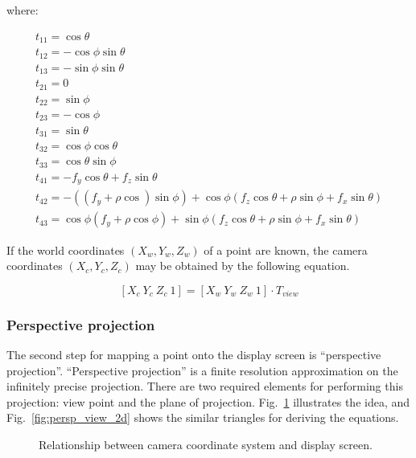 where: 

\[ \begin{array}{l}

	t_{11} = \cos\theta \\
	t_{12} = -\cos\phi\sin\theta \\
	t_{13} = -\sin\phi\sin\theta \\

  	t_{21} = 0 \\
  	t_{22} = \sin\phi \\
  	t_{23} = -\cos\phi \\

  	t_{31} = \sin\theta \\
  	t_{32} = \cos\phi\cos\theta \\
  	t_{33} = \cos\theta\sin\phi \\

  	t_{41} = -f_y\cos\theta + f_z\sin\theta \\
  	t_{42} = -((f_y + \rho\cos)\sin\phi) + \cos\phi(f_z \cos\theta +
			\rho\sin\phi + f_x \sin\theta)  \\
  	t_{43} = \cos\phi(f_y + \rho\cos\phi) + \sin\phi(f_z \cos\theta +
			\rho\sin\phi + f_x \sin\theta)
   \end{array}			
\]

If the world coordinates $(X_w, Y_w, Z_w)$ of a point are known, the
camera coordinates $(X_c, Y_c, Z_c)$ may be obtained by the following
equation.

   \[ [X_c \  Y_c \  Z_c \  1] = [X_w \  Y_w \  Z_w \  1] \cdot T_{view} \]

\subsubsection{Perspective projection}

The second step for mapping a point onto the display screen is
``perspective projection''.  ``Perspective projection'' is a finite
resolution approximation on the infinitely precise projection.   There
are two required elements for performing this projection: view point
and the plane of projection.  Fig.~\ref{fig:persp_view_3d} illustrates
the idea, and Fig.~\ref{fig:persp_view_2d} shows the similar triangles
for deriving the equations.

\begin {figure}[htbp]
  \centerline{
  }
  \caption{Relationship between camera coordinate system and display screen.}
  \label{fig:persp_view_3d}
\end   {figure}

